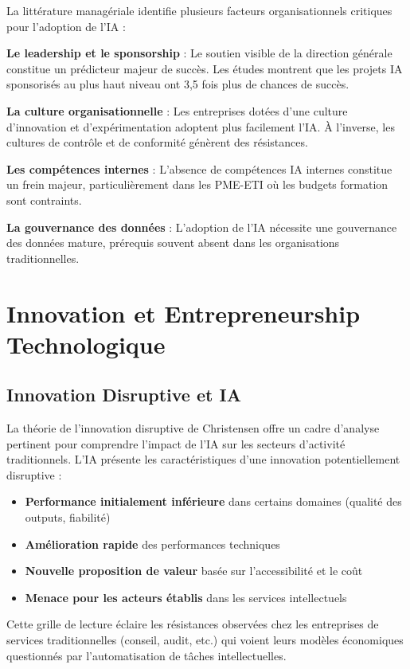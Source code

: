 \documentclass[12pt,a4paper]{report}
\begin{document}
La littérature managériale identifie plusieurs facteurs organisationnels critiques pour l'adoption de l'IA :

\textbf{Le leadership et le sponsorship} : Le soutien visible de la direction générale constitue un prédicteur majeur de succès. Les études montrent que les projets IA sponsorisés au plus haut niveau ont 3,5 fois plus de chances de succès.

\textbf{La culture organisationnelle} : Les entreprises dotées d'une culture d'innovation et d'expérimentation adoptent plus facilement l'IA. À l'inverse, les cultures de contrôle et de conformité génèrent des résistances.

\textbf{Les compétences internes} : L'absence de compétences IA internes constitue un frein majeur, particulièrement dans les PME-ETI où les budgets formation sont contraints.

\textbf{La gouvernance des données} : L'adoption de l'IA nécessite une gouvernance des données mature, prérequis souvent absent dans les organisations traditionnelles.

\section{Innovation et Entrepreneurship Technologique}

\subsection{Innovation Disruptive et IA}

La théorie de l'innovation disruptive de Christensen \cite{christensen1997innovator} offre un cadre d'analyse pertinent pour comprendre l'impact de l'IA sur les secteurs d'activité traditionnels. L'IA présente les caractéristiques d'une innovation potentiellement disruptive :

\begin{itemize}
\item \textbf{Performance initialement inférieure} dans certains domaines (qualité des outputs, fiabilité)
\item \textbf{Amélioration rapide} des performances techniques
\item \textbf{Nouvelle proposition de valeur} basée sur l'accessibilité et le coût
\item \textbf{Menace pour les acteurs établis} dans les services intellectuels
\end{itemize}

Cette grille de lecture éclaire les résistances observées chez les entreprises de services traditionnelles (conseil, audit, etc.) qui voient leurs modèles économiques questionnés par l'automatisation de tâches intellectuelles.
\end{document}
